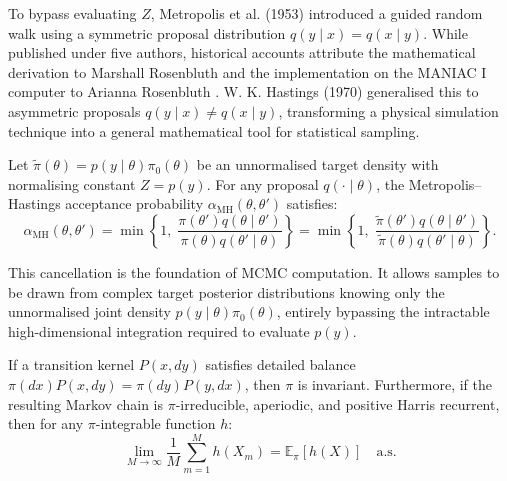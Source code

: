 To bypass evaluating $Z$, Metropolis et al. (1953) \cite{metropolis1953} introduced a guided random walk using a symmetric proposal distribution $q(y \mid x) = q(x \mid y)$. While published under five authors, historical accounts attribute the mathematical derivation to Marshall Rosenbluth and the implementation on the MANIAC I computer to Arianna Rosenbluth \cite{gubernatis2005}. W. K. Hastings (1970) \cite{hastings1970} generalised this to asymmetric proposals $q(y \mid x) \neq q(x \mid y)$, transforming a physical simulation technique into a general mathematical tool for statistical sampling.

\begin{proposition}
\label{prop:cancellation-constant}
Let $\widetilde{\pi}(\theta) = p(y \mid \theta)\pi_0(\theta)$ be an unnormalised target density with normalising constant $Z = p(y)$. For any proposal $q(\cdot \mid \theta)$, the Metropolis--Hastings acceptance probability $\alpha_{\mathrm{MH}}(\theta, \theta')$ satisfies:
\begin{equation}
    \alpha_{\mathrm{MH}}(\theta, \theta') = \min\left\{1, \; \frac{\pi(\theta') q(\theta \mid \theta')}{\pi(\theta) q(\theta' \mid \theta)}\right\} = \min\left\{1, \; \frac{\widetilde{\pi}(\theta') q(\theta \mid \theta')}{\widetilde{\pi}(\theta) q(\theta' \mid \theta)}\right\}.
\end{equation}
\end{proposition}

\noindent This cancellation is the foundation of MCMC computation. It allows samples to be drawn from complex target posterior distributions knowing only the unnormalised joint density $p(y \mid \theta)\pi_0(\theta)$, entirely bypassing the intractable high-dimensional integration required to evaluate $p(y)$.

\begin{theorem}
\label{thm:mcmc-ergodic}
If a transition kernel $P(x, dy)$ satisfies detailed balance $\pi(dx) P(x, dy) = \pi(dy) P(y, dx)$, then $\pi$ is invariant. Furthermore, if the resulting Markov chain is $\pi$-irreducible, aperiodic, and positive Harris recurrent, then for any $\pi$-integrable function $h$:
\begin{equation}
    \lim_{M \to \infty} \frac{1}{M} \sum_{m=1}^{M} h(X_m) = \mathbb{E}_\pi[h(X)] \quad \text{a.s.}
\end{equation}
\end{theorem}


